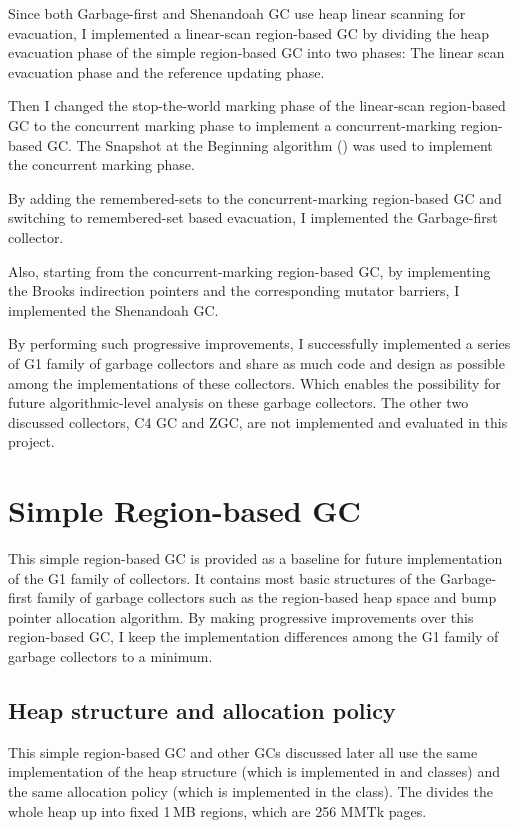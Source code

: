 Since both Garbage-first and Shenandoah GC use heap linear scanning for evacuation,
I implemented a linear-scan region-based GC by dividing the heap evacuation phase
of the simple region-based GC into two phases: The linear scan evacuation phase
and the reference updating phase.

Then I changed the stop-the-world marking phase of the linear-scan region-based GC
to the concurrent marking phase to implement a concurrent-marking region-based GC.
The Snapshot at the Beginning algorithm (\cite{yuasa1990real}) was used to implement the concurrent marking phase.

By adding the remembered-sets to the concurrent-marking region-based GC
and switching to remembered-set based evacuation,
I implemented the Garbage-first collector.

Also, starting from the concurrent-marking region-based GC, by implementing the Brooks indirection pointers
and the corresponding mutator barriers, I implemented the Shenandoah GC.

By performing such progressive improvements, I successfully implemented a series of
G1 family of garbage collectors and share as much code and design as possible
among the implementations of these collectors. Which enables the possibility for future
algorithmic-level analysis on these garbage collectors. The other two discussed
collectors, C4 GC and ZGC, are not implemented and evaluated in this project.

\section{Simple Region-based GC}
\label{sec:simpleregiongc}

This simple region-based GC is provided as a baseline for future implementation of the G1 family of collectors.
It contains most basic structures of the Garbage-first family of garbage collectors such as
the region-based heap space and bump pointer allocation algorithm. By making progressive improvements
over this region-based GC, I keep the implementation differences among the
G1 family of garbage collectors to a minimum.

\subsection{Heap structure and allocation policy}

This simple region-based GC and other GCs discussed later all use the same implementation of the
heap structure (which is implemented in  and  classes) and the
same allocation policy (which is implemented in the  class).
The  divides the whole heap up into fixed 1\,MB regions, which
are 256 MMTk pages.

